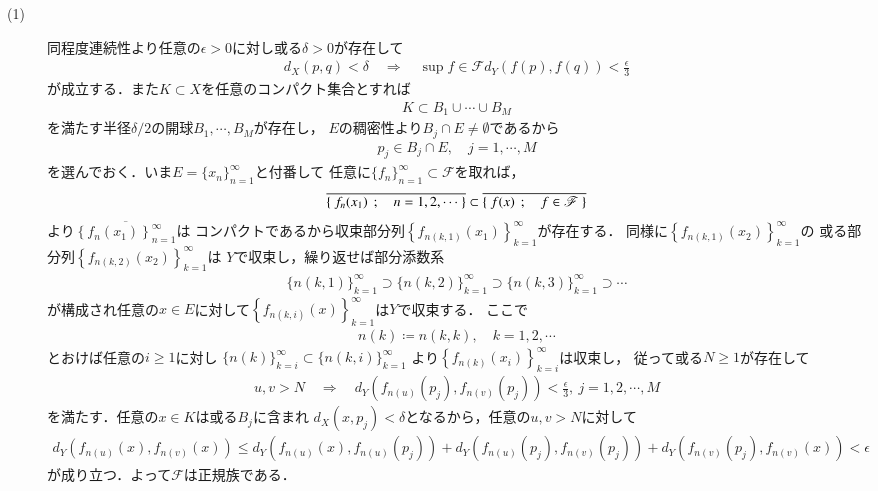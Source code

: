 	\begin{prf}\mbox{}
		\begin{description}
			\item[(1)]
				同程度連続性より任意の$\epsilon > 0$に対し或る$\delta > 0$が存在して
				\begin{align}
					d_X(p,q) < \delta \quad \Longrightarrow \quad
					\sup{f \in \mathscr{F}}{d_Y(f(p),f(q))} < \frac{\epsilon}{3}
				\end{align}
				が成立する．また$K \subset X$を任意のコンパクト集合とすれば
				\begin{align}
					K \subset B_1 \cup \cdots \cup B_M
				\end{align}
				を満たす半径$\delta/2$の開球$B_1,\cdots,B_M$が存在し，
				$E$の稠密性より$B_j \cap E \neq \emptyset$であるから
				\begin{align}
					p_j \in B_j \cap E, \quad j=1,\cdots,M
				\end{align}
				を選んでおく．いま$E = \{x_n\}_{n=1}^\infty$と付番して
				任意に$\{f_n\}_{n=1}^\infty \subset \mathscr{F}$を取れば，
				\begin{align}
					\overline{\left\{\ f_n(x_1)\ \, ; \quad n=1,2,\cdots\ \right\}}
					\subset \overline{\left\{\ f(x)\ \, ; \quad f \in \mathscr{F}\ \right\}}
				\end{align}
				より$\overline{\left\{f_{n}(x_1)\right\}_{n=1}^\infty}$は
				コンパクトであるから収束部分列$\left\{f_{n(k,1)}(x_1)\right\}_{k=1}^\infty$が存在する．
				同様に$\left\{f_{n(k,1)}(x_2)\right\}_{k=1}^\infty$の
				或る部分列$\left\{f_{n(k,2)}(x_2)\right\}_{k=1}^\infty$は
				$Y$で収束し，繰り返せば部分添数系
				\begin{align}
					\{n(k,1)\}_{k=1}^\infty \supset
					\{n(k,2)\}_{k=1}^\infty \supset
					\{n(k,3)\}_{k=1}^\infty \supset
					\cdots
				\end{align}
				が構成され任意の$x \in E$に対して$\left\{f_{n(k,i)}(x)\right\}_{k=1}^\infty$は$Y$で収束する．
				ここで
				\begin{align}
					n(k) \coloneqq n(k,k), \quad k=1,2,\cdots
				\end{align}
				とおけば任意の$i \geq 1$に対し
				$\{n(k)\}_{k=i}^\infty \subset \{n(k,i)\}_{k=1}^\infty$
				より$\left\{f_{n(k)}(x_i)\right\}_{k=i}^\infty$は収束し，
				従って或る$N \geq 1$が存在して
				\begin{align}
					u,v > N \quad \Longrightarrow \quad
					d_Y\left(f_{n(u)}(p_j),f_{n(v)}(p_j)\right) < \frac{\epsilon}{3},\ j=1,2,\cdots,M
				\end{align}
				を満たす．任意の$x \in K$は或る$B_j$に含まれ
				$d_X(x,p_j) < \delta$となるから，任意の$u,v > N$に対して
				\begin{align}
					d_Y(f_{n(u)}(x),f_{n(v)}(x)) \leq 
					d_Y\left(f_{n(u)}(x),f_{n(u)}(p_j)\right) 
					+ d_Y\left(f_{n(u)}(p_j),f_{n(v)}(p_j)\right)
					+ d_Y\left(f_{n(v)}(p_j),f_{n(v)}(x)\right)
					< \epsilon
				\end{align}
				が成り立つ．よって$\mathscr{F}$は正規族である．
		\end{description}
	\end{prf}